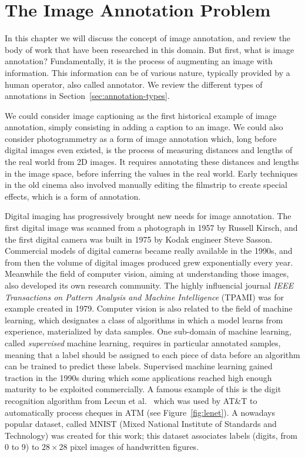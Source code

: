 \chapter{The Image Annotation Problem}%
\label{cha:the_image_annotation_problem}

\adjustmtc
\minitoc%

\newpage
In this chapter we will discuss the concept of image annotation,
and review the body of work that have been researched in this domain.
But first, what is image annotation?
Fundamentally, it is the process of augmenting an image with information.
This information can be of various nature,
typically provided by a human operator, also called annotator.
We review the different types of annotations in Section~\ref{sec:annotation-types}.

We could consider image captioning as the first historical example of image annotation,
simply consisting in adding a caption to an image.
We could also consider photogrammetry as a form of image annotation which,
long before digital images even existed,
is the process of measuring distances and lengths of the real world from 2D images.
It requires annotating these distances and lengths in the image space,
before inferring the values in the real world.
Early techniques in the old cinema also involved
manually editing the filmstrip to create special effects, which is a form of annotation.

Digital imaging has progressively brought new needs for image annotation.
The first digital image was scanned from a photograph in 1957 by Russell Kirsch,
and the first digital camera was built in 1975 by Kodak engineer Steve Sasson.
Commercial models of digital cameras became really available in the 1990s,
and from then the volume of digital images produced grew exponentially every year.
Meanwhile the field of computer vision, aiming at understanding those images,
also developed its own research community.
The highly influencial journal \textit{IEEE Transactions on Pattern Analysis
and Machine Intelligence} (TPAMI) was for example created in 1979.
Computer vision is also related to the field of machine learning,
which designates a class of algorithms in which a model learns from experience,
materialized by data samples.
One sub-domain of machine learning, called \textit{supervised} machine learning,
requires in particular annotated samples,
meaning that a label should be assigned to each piece of data before
an algorithm can be trained to predict these labels.
Supervised machine learning gained traction in the 1990s during which
some applications reached high enough maturity to be exploited commercially.
A famous example of this is the digit recognition algorithm from
Lecun et al.~\cite{lecun1998gradient} which was used by AT\&T
to automatically process cheques in ATM (see Figure~\ref{fig:lenet}).
A nowadays popular dataset,
called MNIST (Mixed National Institute of Standards and Technology)
was created for this work;
this dataset associates labels (digits, from 0 to 9)
to $28\times 28$ pixel images of handwritten figures.

